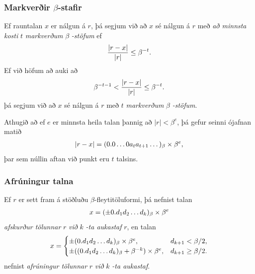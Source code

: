 \documentclass[a4paper,10pt,icelandic]{sphinxmanual}
\begin{document}
\subsubsection{Markverðir \(\beta\)-stafir}
\label{kafli01:markverir-stafir}
Ef rauntalan \(x\) er nálgun á \(r\), þá segjum við að \(x\)
sé nálgun á \(r\) með \emph{að minnsta kosti} \(t\) \emph{markverðum}
\(\beta\) \emph{-stöfum} ef
\begin{gather}
\begin{split}\dfrac{|r-x|}{|r|}\leq \beta^{-t}.\end{split}\notag
\end{gather}
Ef við höfum að auki að
\begin{gather}
\begin{split}\beta^{-t-1}<\dfrac{|r-x|}{|r|}\leq \beta^{-t}.\end{split}\notag
\end{gather}
þá segjum við að \(x\) sé nálgun á \(r\) með \(t\)
\emph{markverðum} \(\beta\) \emph{-stöfum}.

Athugið að ef \(e\) er minnsta heila talan þannig að
\(|r|<\beta^e\), þá gefur seinni ójafnan matið
\begin{gather}
\begin{split}|r-x| = (0.0\dots 0a_ta_{t+1}\dots)_\beta \times \beta^e,\end{split}\notag
\end{gather}
þar sem núllin aftan við punkt eru \(t\) talsins.


\subsubsection{Afrúningur talna}
\label{kafli01:index-17}\label{kafli01:afruningur-talna}
Ef \(r\) er sett fram á stöðluðu \(\beta\)-fleytitöluformi, þá
nefnist talan
\begin{gather}
\begin{split}x = (\pm 0.d_1d_2\dots d_k)_\beta\times \beta^e\end{split}\notag
\end{gather}
\emph{afskurður tölunnar} \(r\) \emph{við} \(k\) \emph{-ta aukastaf} \(r\), en
talan
\begin{gather}
\begin{split}x = \begin{cases}
    \pm (0.d_1d_2\dots d_k)_\beta\times \beta^e, &
    d_{k+1}<\beta/2,\\
    \pm ((0.d_1d_2\dots d_k)_\beta+\beta^{-k})\times \beta^e,
    &d_{k+1}\geq \beta/2.
    \end{cases}\end{split}\notag
\end{gather}
nefnist \emph{afrúningur tölunnar} \(r\) \emph{við} \(k\) \emph{-ta aukastaf}.
\end{document}
